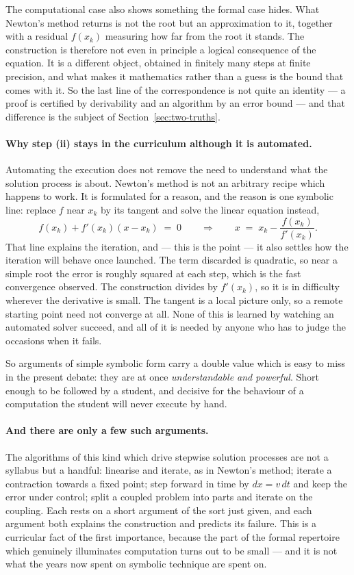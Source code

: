\documentclass[11pt]{article}
\begin{document}
The computational case also shows something the formal case hides. What Newton's method returns is
not the root but an approximation to it, together with a residual $f(x_k)$ measuring how far from
the root it stands. The construction is therefore not even in principle a logical consequence of the
equation. It is a different object, obtained in finitely many steps at finite precision, and what
makes it mathematics rather than a guess is the bound that comes with it. So the last line of the
correspondence is not quite an identity --- a proof is certified by derivability and an algorithm by
an error bound --- and that difference is the subject of Section~\ref{sec:two-truths}.

\paragraph{Why step (ii) stays in the curriculum although it is automated.} Automating the
execution does not remove the need to understand what the solution process is about. Newton's
method is not an arbitrary recipe which happens to work. It is formulated for a reason, and the
reason is one symbolic line: replace $f$ near $x_k$ by its tangent and solve the linear equation
instead,
\[
f(x_k) + f'(x_k)(x-x_k) \;=\; 0 \qquad\Longrightarrow\qquad x \;=\; x_k - \frac{f(x_k)}{f'(x_k)} .
\]
That line explains the iteration, and --- this is the point --- it also settles how the iteration
will behave once launched. The term discarded is quadratic, so near a simple root the error is
roughly squared at each step, which is the fast convergence observed. The construction divides by
$f'(x_k)$, so it is in difficulty wherever the derivative is small. The tangent is a local picture
only, so a remote starting point need not converge at all. None of this is learned by watching an
automated solver succeed, and all of it is needed by anyone who has to judge the occasions when it
fails.

So arguments of simple symbolic form carry a double value which is easy to miss in the present
debate: they are at once \emph{understandable and powerful}. Short enough to be followed by a
student, and decisive for the behaviour of a computation the student will never execute by hand.

\paragraph{And there are only a few such arguments.} The algorithms of this kind which drive
stepwise solution processes are not a syllabus but a handful: linearise and iterate, as in Newton's
method; iterate a contraction towards a fixed point; step forward in time by $dx = v\,dt$ and keep
the error under control; split a coupled problem into parts and iterate on the coupling. Each rests
on a short argument of the sort just given, and each argument both explains the construction and
predicts its failure. This is a curricular fact of the first importance, because the part of the
formal repertoire which genuinely illuminates computation turns out to be small --- and it is not
what the years now spent on symbolic technique are spent on.
\end{document}
